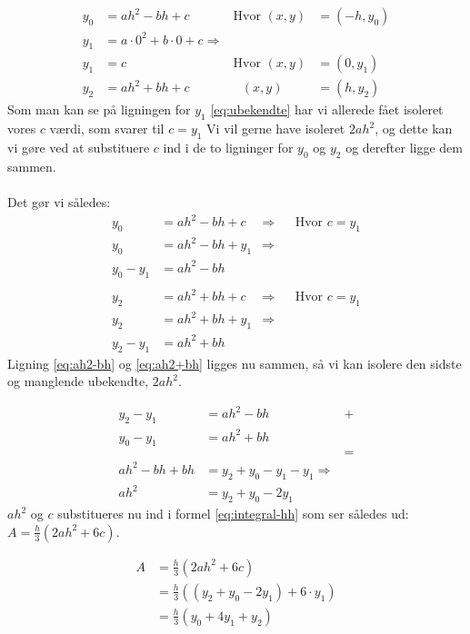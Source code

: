 \documentclass[12pt]{article}
\numberwithin{equation}{section}
\begin{document}
\begin{align}
\label{eq:ubekendte}
y_0 &= ah^2-bh+c & \text{Hvor } (x,y) &=(-h,y_0)
\\ y_1 &= a \cdot 0^2+b \cdot 0 +c \Rightarrow \nonumber
\\ y_1 &= c & \text{Hvor } (x,y) &=(0,y_1)
\\ y_2 &= ah^2+bh+c & \text{ } (x,y) &=(h,y_2)
\end{align}
Som man kan se på ligningen for $y_1$ \eqref{eq:ubekendte} har vi allerede fået isoleret vores $c$ værdi, som svarer til $c=y_1$
Vi vil gerne have isoleret $2ah^2$, og dette kan vi gøre ved at substituere $c$ ind i de to ligninger for $y_0$ og $y_2$ og derefter ligge dem sammen.
\\\\
Det gør vi således:
\begin{align}
y_0 &= ah^2 - bh + c &\Rightarrow &&\text{Hvor } c=y_1 \nonumber
\\ y_0 &= ah^2 -bh + y_1 & \Rightarrow \nonumber
\\ y_0-y_1 &= ah^2-bh
\label{eq:ah2-bh}
\\ \nonumber
\\y_2 &= ah^2 + bh + c &\Rightarrow &&\text{Hvor } c=y_1 \nonumber
\\y_2 &= ah^2 + bh + y_1 & \Rightarrow \nonumber
\\y_2 - y_1 &= ah^2 +bh
\label{eq:ah2+bh}
\end{align}
Ligning \eqref{eq:ah2-bh} og \eqref{eq:ah2+bh} ligges nu sammen, så vi kan isolere den sidste og manglende ubekendte, $2ah^2$.

\begin{align}
	y_2 - y_1 &= ah^2 - bh &+ \nonumber
\\	y_0 - y_1 &= ah^2 + bh \nonumber
\\ &&= \nonumber
\\ ah^2 -bh + bh &= y_2 + y_0 - y_1 - y_1 \Rightarrow \nonumber
\\ ah^2 &= y_2 + y_0 - 2y_1
\end{align}
$ah^2$ og $c$ substitueres nu ind i formel \eqref{eq:integral-hh} som ser således ud: $A = \frac{h}{3}(2ah^2+6c).$

\begin{align}
\label{eq:ensimpson}
A &= \frac{h}{3}(2ah^2+6c) \nonumber
\\&= \frac{h}{3}\left( \left( y_2+y_0-2y_1 \right) + 6 \cdot y_1 \right) \nonumber
\\&= \frac{h}{3}(y_0+4y_1+y_2)
\end{align}
\end{document}
